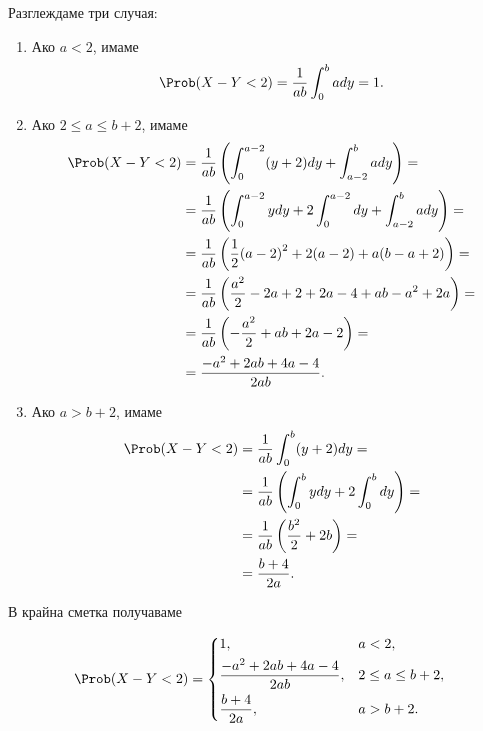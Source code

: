 \documentclass[
  headings=standardclasses,
  bibliography=totocnumbered,
]{scrartcl}
\begin{document}
\begin{solution}
\begin{enumerate}[label=\alph*)]
    Разглеждаме три случая:
    \begin{enumerate}[label=\arabic*)]
      \item Ако \( a < 2 \), имаме
      \begin{equation*}
        \Prob(X - Y < 2)
        =
        \frac 1 {ab} \int_0^b a dy
        =
        1.
      \end{equation*}

      \item Ако \( 2 \leq a \leq b + 2 \), имаме
      \begin{align*}
        \Prob(X - Y < 2)
        &=
        \frac 1 {ab} \left(\int_0^{a-2} (y+2) dy + \int_{a-2}^b a dy \right)
        = \\ &=
        \frac 1 {ab} \left(\int_0^{a-2} y dy + 2 \int_0^{a-2} dy + \int_{a-2}^b a dy \right)
        = \\ &=
        \frac 1 {ab} \left(\frac 1 2 {(a-2)}^2 + 2(a-2) + a(b-a+2) \right)
        = \\ &=
        \frac 1 {ab} \left(\frac {a^2} 2 - 2a + 2 + 2a - 4 + ab - a^2 + 2a \right)
        = \\ &=
        \frac 1 {ab} \left(-\frac {a^2} 2 + ab + 2a - 2 \right)
        = \\ &=
        \frac {-a^2 + 2ab + 4a - 4} {2ab}.
      \end{align*}

      \item Ако \( a > b + 2 \), имаме
      \begin{align*}
        \Prob(X - Y < 2)
        &=
        \frac 1 {ab} \int_0^b (y+2) dy
        = \\ &=
        \frac 1 {ab} \left( \int_0^b y dy + 2 \int_0^b dy \right)
        = \\ &=
        \frac 1 {ab} \left(\frac {b^2} 2 + 2b \right)
        = \\ &=
        \frac {b + 4} {2a}.
      \end{align*}
    \end{enumerate}

    В крайна сметка получаваме

    \begin{align*}
      \Prob(X - Y < 2) = \begin{dcases}
        1, &a < 2, \\
        \frac {-a^2 + 2ab + 4a - 4} {2ab}, &2 \leq a \leq b + 2, \\
        \frac {b + 4} {2a}, &a > b + 2.
      \end{dcases}
    \end{align*}
  \end{enumerate}
\end{solution}

\printbibliography
\end{document}
